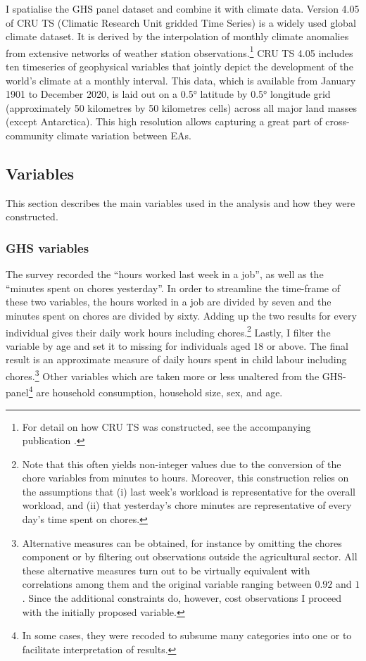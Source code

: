 \documentclass[a4paper,12pt]{article}
\theoremstyle{plain}
\theoremstyle{definition}
\theoremstyle{definition}
\theoremstyle{definition}
\theoremstyle{definition}
\begin{document}
I spatialise the GHS panel dataset and combine it with climate data. Version 4.05 of CRU TS (Climatic Research Unit gridded Time Series) is a widely used global climate dataset. It is derived by the interpolation of monthly climate anomalies from extensive networks of weather station observations.\footnote{For detail on how CRU TS was constructed, see the accompanying publication \citep{harris2020}.} CRU TS 4.05 includes ten timeseries of geophysical variables that jointly depict the development of the world's climate at a monthly interval. This data, which is available from January 1901 to December 2020, is laid out on a 0.5° latitude by 0.5° longitude grid (approximately 50 kilometres by 50 kilometres cells) across all major land masses (except Antarctica). This high resolution allows capturing a great part of cross-community climate variation between EAs.

\subsection{Variables}
\label{sub:variables}

This section describes the main variables used in the analysis and how they were constructed.

\subsubsection{GHS variables}
\label{subsub:ghsvars}
The survey recorded the ``hours worked last week in a job'', as well as the ``minutes spent on chores yesterday''. In order to streamline the time-frame of these two variables, the hours worked in a job are divided by seven and the minutes spent on chores are divided by sixty. Adding up the two results for every individual gives their daily work hours including chores.\footnote{Note that this often yields non-integer values due to the conversion of the chore variables from minutes to hours. Moreover, this construction relies on the assumptions that (i) last week's workload is representative for the overall workload, and (ii) that yesterday's chore minutes are representative of every day's time spent on chores.} Lastly, I filter the variable by age and set it to missing for individuals aged 18 or above. The final result is an approximate measure of daily hours spent in child labour including chores.\footnote{Alternative measures can be obtained, for instance by omitting the chores component or by filtering out observations outside the agricultural sector. All these alternative measures turn out to be virtually equivalent with correlations among them and the original variable ranging between $0.92$ and $1$. Since the additional constraints do, however, cost observations I proceed with the initially proposed variable.} Other variables which are taken more or less unaltered from the GHS-panel\footnote{In some cases, they were recoded to subsume many categories into one or to facilitate interpretation of results.} are household consumption, household size, sex, and age.
\end{document}
